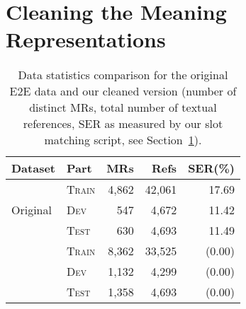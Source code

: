 \documentclass[11pt,a4paper]{article}
\begin{document}
\section{Cleaning the Meaning Representations}
\label{sec:cleaning-mrs}

\begin{table}[tb]
\centering\small
\begin{tabular}{llrrr}\hline
\bf Dataset                  & \bf Part    &  \bf MRs & \bf Refs & \bf SER(\%) \\\hline
\multirow{3}{*}{Original}    & \textsc{Train}       &   4,862  &  42,061  &   17.69 \\
                             & \textsc{Dev}         &     547  &   4,672  &   11.42 \\
                             & \textsc{Test}        &     630  &   4,693  &   11.49 \\\hdashline[0.5pt/2pt]
\multirow{3}{*}{Cleaned}     & \textsc{Train}       &   8,362  &  33,525  &  (0.00) \\
                             & \textsc{Dev}         &   1,132  &   4,299  &  (0.00) \\
                             & \textsc{Test}        &   1,358  &   4,693  &  (0.00) \\\hline
\end{tabular}
\caption{Data statistics comparison for the original E2E data and our cleaned version (number of distinct MRs, total number of textual references, SER as measured by our slot matching script, see Section~\ref{sec:cleaning-mrs}).}
\label{tab:cleaned-data-stats}
\end{table}
\end{document}
